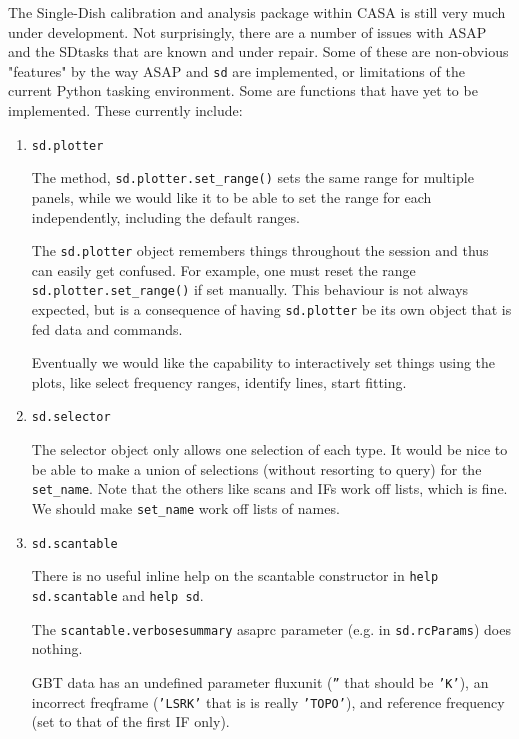 The Single-Dish calibration and analysis package within CASA is still
very much under development.  Not surprisingly,
there are a number of issues with ASAP and the SDtasks that are known and
under repair.  Some of these are non-obvious "features" by the way
ASAP and {\tt sd} are implemented, or limitations of the current Python
tasking environment.  Some are functions that have yet to be
implemented.  These currently include: 

\begin{enumerate}

\item {\tt sd.plotter}

  The method, {\tt sd.plotter.set\_range()} sets the same range for
  multiple panels, while we would like it to be able to set the
  range for each independently, including the default ranges.

  The {\tt sd.plotter} object remembers things throughout the session and
  thus can easily get confused. For example, one must reset the
  range {\tt sd.plotter.set\_range()} if set manually. This behaviour is
  not always expected, but is a consequence of having {\tt sd.plotter} be
  its own object that is fed data and commands.

  Eventually we would like the capability to interactively
  set things using the plots, like select frequency ranges,
  identify lines, start fitting. 

\item {\tt sd.selector}

  The selector object only allows one selection of each type.  It would be 
  nice to be able to make a union of selections (without resorting to query)
  for the {\tt set\_name}.  Note that the others like scans and IFs work off
  lists, which is fine.  We should make {\tt set\_name} work off lists of names.

\item {\tt sd.scantable}

  There is no useful inline help on the scantable constructor
  in {\tt help sd.scantable} and {\tt help sd}.

  The {\tt scantable.verbosesummary}
  asaprc parameter (e.g. in {\tt sd.rcParams}) does nothing.

  GBT data has an undefined parameter fluxunit ({\tt ''} that should be {\tt 'K'}), an 
  incorrect freqframe ({\tt 'LSRK'} that is is really {\tt 'TOPO'}), and reference
  frequency (set to that of the first IF only).



\end{enumerate}
